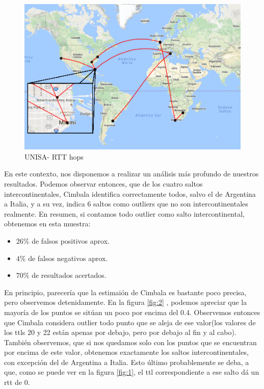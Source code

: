 \newpage

\begin{figure}[!htbp]
  \centering
    \includegraphics[scale=0.6]{imagenes/unisa-graficos/mapa-unisa.png}
  \caption{UNISA- RTT hops}
  \label{mapa-unisa}
\end{figure}

En este contexto, nos disponemos a realizar un análisis más profundo de nuestros resultados. Podemos observar entonces, que de los cuatro saltos intercontinentales, Cimbala identifica correctamente todos, salvo el de Argentina a Italia, y a su vez, indica 6 saltos como outliers que no son intercontinentales realmente. En resumen, si contamos todo outlier como salto intercontinental, obtenemos en esta muestra:

\begin{itemize}
	\item $26 \% $ de falsos positivos aprox.
	\item $4 \%$ de falsos negativos aprox.
	\item $70 \%$ de resultados acertados.
\end{itemize}

En principio, parecería que la estimaión de Cimbala es bastante poco precisa, pero observemos detenidamente. En la figura \ref{fig:2} , podemos apreciar que la mayoría de los puntos se sitúan un poco por encima del 0.4. Observemos entonces que Cimbala considera outlier todo  punto que se aleja de ese valor(los valores de los ttls 20 y 22 están apenas por debajo, pero por debajo al fin y al cabo). También observemos, que si nos quedamos solo con los puntos que se encuentran por encima de este valor, obtenemos exactamente los saltos intercontinentales, con excepción del de Argentina a Italia. Esto último probablemente se deba, a que, como se puede ver en la figura \ref{fig:1}, el ttl correspondiente a ese salto dá un rtt de 0.

